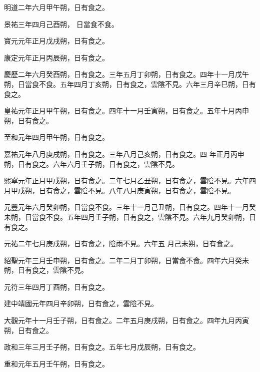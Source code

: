 \begin{pinyinscope}
 明道二年六月甲午朔，日有食之。



 景祐三年四月己酉朔，
 日當食不食。



 寶元元年正月戊戌朔，日有食之。



 康定元年正月丙辰朔，日有食之。



 慶歷二年六月癸酉朔，日有食之。三年五月丁卯朔，日有食之。四年十一月戊午朔，日當食不食。五年四月丁亥朔，日有食之，雲陰不見。六年三月辛巳朔，日有食之。



 皇祐元年正月甲午朔，日有食之。四年十一月壬寅朔，日有食之。五年十月丙申朔，日有食之。



 至和元年四月甲午朔，日有食之。



 嘉祐元年八月庚戌朔，日有食之。三年八月己亥朔，日有食之。四
 年正月丙申朔，日有食之。六年六月壬子朔，日有食之，雲陰不見。



 熙寧元年正月甲戌朔，日有食之。二年七月乙丑朔，日有食之，雲陰不見。六年四月甲戌朔，日有食之，雲陰不見。八年八月庚寅朔，日有食之，雲陰不見。



 元豐元年六月癸卯朔，日當食不食。三年十一月己丑朔，日有食之。四年十一月癸未朔，日當食不食。五年四月壬子朔，日有食之，雲陰不見。六年九月癸卯朔，日有食之。



 元祐二年七月庚戌朔，日有食之，陰雨不見。六年五
 月己未朔，日有食之。



 紹聖元年三月壬申朔，日有食之。二年二月丁卯朔，日當食不食。四年六月癸未朔，日有食之，雲陰不見。



 元符三年四月丁酉朔，日有食之。



 建中靖國元年四月辛卯朔，日有食之，雲陰不見。



 大觀元年十一月壬子朔，日有食之。二年五月庚戌朔，日有食之。四年九月丙寅朔，日有食之。



 政和三年三月壬子朔，日有食之。五年七月戊辰朔，日有食之。



 重和元年五月壬午朔，日有食之。




\end{pinyinscope}
